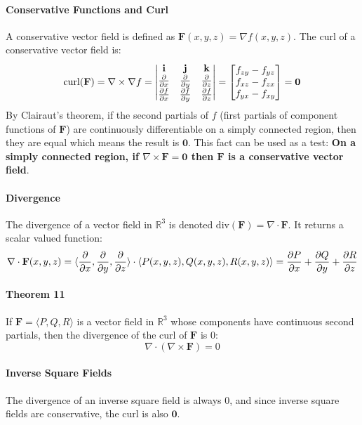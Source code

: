 \documentclass{article}
\begin{document}
\paragraph{Conservative Functions and Curl} A conservative vector field is defined as $\mathbf{F}(x,y,z) = \nabla f(x,y,z)$. The curl of a conservative vector field is:
\[ 
    \mathrm{curl}(\mathbf{F}) = \nabla \times \nabla f =
    \begin{vmatrix}
        \mathbf{i} & \mathbf{j} & \mathbf{k} \\
        \frac{\partial }{\partial x} & \frac{\partial }{\partial y} & \frac{\partial }{\partial z} \\
        \frac{\partial f}{\partial x} & \frac{\partial f}{\partial y} & \frac{\partial f}{\partial z} \\
    \end{vmatrix}
    = \begin{bmatrix}
        f_{zy}-f_{yz} \\
        f_{xz} - f_{zx} \\
        f_{yx} - f_{xy} \\
    \end{bmatrix}
    = \mathbf{0}
\]
By Clairaut's theorem, if the second partials of $f$ (first partials of component functions of $\mathbf{F}$) are continuously differentiable on a simply connected region, then they are equal which means the result is $\mathbf{0}$. This fact can be used as a test: \textbf{On a simply connected region, if $\nabla \times \mathbf{F}=\mathbf{0}$ then $\mathbf{F}$ is a conservative vector field}.

\paragraph{Divergence} The divergence of a vector field in $\mathbb{R}^3$ is denoted $\mathrm{div}(\mathbf{F}) = \nabla \cdot \mathbf{F}$. It returns a scalar valued function:
\[ \nabla \cdot \mathbf{F}(x,y,z) = \langle \frac{\partial }{\partial x}, \frac{\partial }{\partial y}, \frac{\partial }{\partial z} \rangle \cdot \langle P(x,y,z), Q(x,y,z), R(x,y,z) \rangle = \frac{\partial P}{\partial x} + \frac{\partial Q}{\partial y} + \frac{\partial R}{\partial z}\]

\paragraph{Theorem 11} If $\mathbf{F} = \langle P, Q, R \rangle$ is a vector field in $\mathbb{R}^3$ whose components have continuous second partials, then the divergence of the curl of $\mathbf{F}$ is 0:
\[ \nabla \cdot (\nabla \times \mathbf{F}) = 0 \]

\paragraph{Inverse Square Fields} The divergence of an inverse square field is always 0, and since inverse square fields are conservative, the curl is also $\mathbf{0}$.
\end{document}
